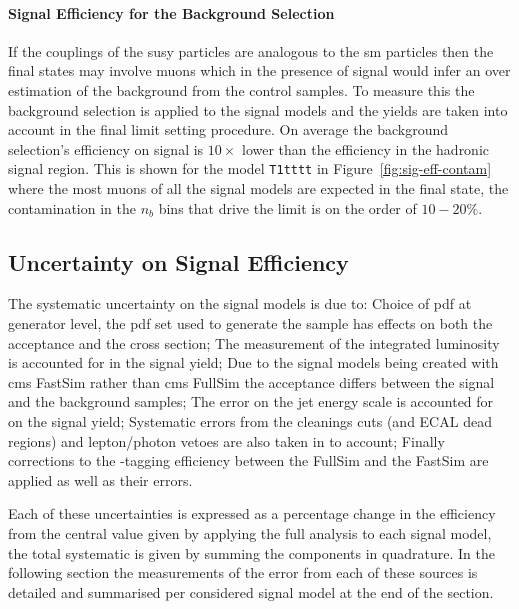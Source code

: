 \paragraph{Signal Efficiency for the Background Selection} %
\label{par:signal_efficiency_for_the_background_selection}
If the couplings of the \ac{susy} particles are analogous to the \ac{sm} 
particles then the final states may involve muons which in the presence of 
signal would infer an over estimation of the background from the control 
samples.
To measure this the background selection is applied to the signal models and 
the yields are taken into account in the final limit setting procedure. On 
average the background selection's efficiency on signal is $10\times$ lower 
than the efficiency in the hadronic signal region. This is shown for the model 
\texttt{T1tttt} in Figure~\ref{fig:sig-eff-contam} where the most muons of all 
the signal models are expected in the final state, the contamination in the 
$n_{b}$ bins that drive the limit is on the order of $10-20\%$.

\subsection{Uncertainty on Signal Efficiency} %
\label{sub:uncertainty_on_signal_efficiency}
The systematic uncertainty on the signal models is due to: Choice of \ac{pdf} 
at generator level, the \ac{pdf} set used to generate the sample has effects on 
both the acceptance and the cross section; The measurement of the integrated 
luminosity is accounted for in the signal yield; Due to the signal models being 
created with \ac{cms} FastSim\cite{} rather than \ac{cms} FullSim\cite{} the 
acceptance differs between the signal and the background samples; The error on 
the jet energy scale is accounted for on the signal yield; Systematic errors 
from the cleanings cuts (\Rmiss and ECAL dead regions) and lepton/photon vetoes 
are also taken in to account; Finally corrections to the \Pbottom-tagging 
efficiency between the FullSim and the FastSim are applied as well as their 
errors.

Each of these uncertainties is expressed as a percentage change in the 
efficiency from the central value given by applying the full analysis to each 
signal model, the total systematic is given by summing the components in 
quadrature. In the following section the measurements of the error from each of 
these sources is detailed and summarised per considered signal model at the end 
of the section.

